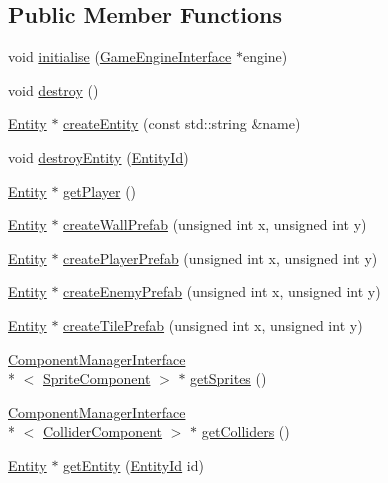 \subsection*{Public Member Functions}
\begin{DoxyCompactItemize}
\item 
void \hyperlink{classEntityManager_a97a7e5a629a5ffe85a2859384e5ce701}{initialise} (\hyperlink{classGameEngineInterface}{Game\-Engine\-Interface} $\ast$engine)
\item 
void \hyperlink{classEntityManager_af84b8842db8f732039c41dc4bc30b0c1}{destroy} ()
\item 
\hyperlink{classEntity}{Entity} $\ast$ \hyperlink{classEntityManager_af54f317708b43ec7c22be0495a8ce3c0}{create\-Entity} (const std\-::string \&name)
\item 
void \hyperlink{classEntityManager_afe54803a7170a4a2d2614348ed9f7cab}{destroy\-Entity} (\hyperlink{entity_8h_a3812b46f7256476cf244cbc0f4a3bde9}{Entity\-Id})
\item 
\hyperlink{classEntity}{Entity} $\ast$ \hyperlink{classEntityManager_a098b4e50944a8caffb723e7d0dffbb70}{get\-Player} ()
\item 
\hyperlink{classEntity}{Entity} $\ast$ \hyperlink{classEntityManager_a6d7f11fe8bfe9821377108874b6248e3}{create\-Wall\-Prefab} (unsigned int x, unsigned int y)
\item 
\hyperlink{classEntity}{Entity} $\ast$ \hyperlink{classEntityManager_aa450f3815645d947e41bec34fd7c628e}{create\-Player\-Prefab} (unsigned int x, unsigned int y)
\item 
\hyperlink{classEntity}{Entity} $\ast$ \hyperlink{classEntityManager_a8110b8b5376e15127609753e52bd779f}{create\-Enemy\-Prefab} (unsigned int x, unsigned int y)
\item 
\hyperlink{classEntity}{Entity} $\ast$ \hyperlink{classEntityManager_a37c9debe4a2ecb9316441ea19fdbe04e}{create\-Tile\-Prefab} (unsigned int x, unsigned int y)
\item 
\hyperlink{classComponentManagerInterface}{Component\-Manager\-Interface}\\*
$<$ \hyperlink{structSpriteComponent}{Sprite\-Component} $>$ $\ast$ \hyperlink{classEntityManager_a0af107dd34e63fa9e84d7b0e0e81d5ba}{get\-Sprites} ()
\item 
\hyperlink{classComponentManagerInterface}{Component\-Manager\-Interface}\\*
$<$ \hyperlink{structColliderComponent}{Collider\-Component} $>$ $\ast$ \hyperlink{classEntityManager_ab024c88ff91734e8ba57bba27c985dca}{get\-Colliders} ()
\item 
\hyperlink{classEntity}{Entity} $\ast$ \hyperlink{classEntityManager_a23e110f8bc01067e5bd953e8b7008273}{get\-Entity} (\hyperlink{entity_8h_a3812b46f7256476cf244cbc0f4a3bde9}{Entity\-Id} id)
\end{DoxyCompactItemize}
